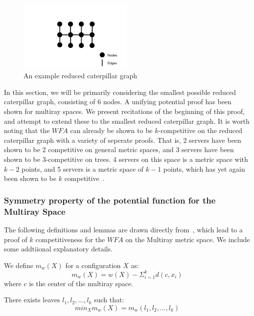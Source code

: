 \begin{figure}[H]
    \centering
    \includegraphics[width=0.5\textwidth]{images/reducedCaterpillar.png}
    \caption{An example reduced caterpillar graph}
\end{figure}

In this section, we will be primarily considering the smallest possible reduced caterpillar graph, consisting of 6 nodes. A unifying potential proof has been shown for multiray spaces. We present recitations of the beginning of this proof, and attempt to extend these to the smallest reduced caterpillar graph. It is worth noting that the $WFA$ can already be shown to be $k$-competitive on the reduced caterpillar graph with a variety of seperate proofs. That is, 2 servers have been shown to be 2 competitive on general metric spaces, and 3 servers have been shown to be $3$-competitive on trees. 4 servers on this space is a metric space with $k-2$ points, and 5 servers is a metric space of $k-1$ points, which has yet again been shown to be $k$ competitive~\cite{unifyingPotential2021}.

\subsubsection*{Symmetry property of the potential function for the Multiray Space}

The following definitions and lemmas are drawn directly from~\cite{unifyingPotential2021}, which lead to a proof of $k$ competitiveness for the $WFA$ on the Multiray metric space. We include some addtiional explanatory details.

\begin{definition}
    \label{def:mw}
    We define $m_w(X)$ for a configuration $X$ as:
    \begin{equation*}
        m_w(X) = w(X) - \Sigma_{i=1} ^ k d(c, x_i)
    \end{equation*}
    where $c$ is the center of the multiray space.
\end{definition}

\begin{lemma}
    \label{lem:leaf2}
    There exists leaves $l_1, l_2, ..., l_k$ such that: 
    \begin{equation*}
        min_X m_w(X) = m_w (l_1, l_2, ..., l_k)
    \end{equation*}
\end{lemma}


